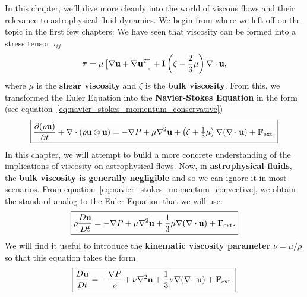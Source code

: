 In this chapter, we'll dive more cleanly into the world of viscous flows and their relevance to astrophysical fluid dynamics. We begin from where we left off on the topic in the first few chapters: We have seen that viscosity can be formed into a stress tensor $\tau_{ij}$ 
\[
\boldsymbol{\tau} = \mu\left[\nabla {\bf u} + \nabla{\bf u}^T\right] + {\bf I}\left(\zeta-\frac{2}{3}\mu\right)\nabla \cdot {\bf u},
\]
where $\mu$ is the \textbf{shear viscosity} and $\zeta$ is the \textbf{bulk viscosity}. From this, we transformed the Euler Equation into the \textbf{Navier-Stokes Equation} in the form (see equation~\ref{eq:navier_stokes_momentum_conservative})
\begin{equation}
\boxed{
\frac{\partial (\rho \mathbf{u})}{\partial t}
+ \nabla \cdot (\rho \mathbf{u}\otimes \mathbf{u})
= -\nabla P + \mu \nabla^2 \mathbf{u}
+ \left(\zeta + \tfrac{1}{3}\mu\right)\nabla(\nabla \cdot \mathbf{u})
+ {\bf F}_{\rm ext}.}
\end{equation}
In this chapter, we will attempt to build a more concrete understanding of the implications of viscosity on astrophysical flows. Now, in \textbf{astrophysical fluids}, the \textbf{bulk viscosity is generally negligible} and so we can ignore it in most scenarios. From equation~\eqref{eq:navier_stokes_momentum_convective}, we obtain the standard analog to the Euler Equation that we will use:
\begin{equation}
    \boxed{
    \rho \frac{D{\bf u}}{Dt} = -\nabla P + \mu \nabla^2 {\bf u} + \frac{1}{3}\mu \nabla(\nabla \cdot {\bf u}) + {\bf F}_{\rm ext}.
    }
\end{equation}
We will find it useful to introduce the \textbf{kinematic viscosity parameter} $\nu = \mu/\rho$ so that this equation takes the form
\begin{equation}
    \boxed{
    \frac{D{\bf u}}{Dt} = -\frac{\nabla P}{\rho} + \nu \nabla^2 {\bf u} + \frac{1}{3}\nu \nabla(\nabla \cdot {\bf u}) + {\bf F}_{\rm ext}.
    }
\end{equation}
